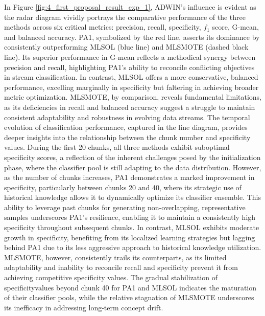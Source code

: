 In Figure \ref{fig:4_first_proposal_result_exp_1}, ADWIN’s influence is evident as the radar diagram vividly portrays the comparative performance of the three methods across six critical metrics: precision, recall, specificity, $f_1$ score, G-mean, and balanced accuracy. PA1, symbolized by the red line, asserts its dominance by consistently outperforming MLSOL (blue line) and MLSMOTE (dashed black line). Its superior performance in G-mean reflects a methodical synergy between precision and recall, highlighting PA1’s ability to reconcile conflicting objectives in stream classification. In contrast, MLSOL offers a more conservative, balanced performance, excelling marginally in specificity but faltering in achieving broader metric optimization. MLSMOTE, by comparison, reveals fundamental limitations, as its deficiencies in recall and balanced accuracy suggest a struggle to maintain consistent adaptability and robustness in evolving data streams. The temporal evolution of classification performance, captured in the line diagram, provides deeper insights into the relationship between the chunk number and specificity values. During the first 20 chunks, all three methods exhibit suboptimal specificity scores, a reflection of the inherent challenges posed by the initialization phase, where the classifier pool is still adapting to the data distribution. However, as the number of chunks increases, PA1 demonstrates a marked improvement in specificity, particularly between chunks 20 and 40, where its strategic use of historical knowledge allows it to dynamically optimize its classifier ensemble. This ability to leverage past chunks for generating non-overlapping, representative samples underscores PA1’s resilience, enabling it to maintain a consistently high specificity throughout subsequent chunks. In contrast, MLSOL exhibits moderate growth in specificity, benefiting from its localized learning strategies but lagging behind PA1 due to its less aggressive approach to historical knowledge utilization. MLSMOTE, however, consistently trails its counterparts, as its limited adaptability and inability to reconcile recall and specificity prevent it from achieving competitive specificity values. The gradual stabilization of specificityvalues beyond chunk 40 for PA1 and MLSOL indicates the maturation of their classifier pools, while the relative stagnation of MLSMOTE underscores its inefficacy in addressing long-term concept drift.
